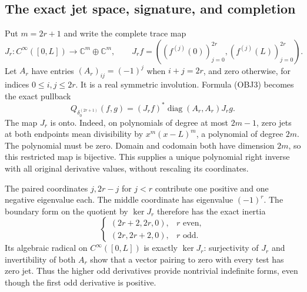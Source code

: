 \subsection{The exact jet space, signature, and completion}

Put $m=2r+1$ and write the complete trace map
\begin{equation}\tag{OBJ4}
 J_r:C^\infty([0,L])\longrightarrow\mathbb C^m\oplus\mathbb C^m,
 \qquad J_rf=((f^{(j)}(0))_{j=0}^{2r},(f^{(j)}(L))_{j=0}^{2r}).
\end{equation}
Let $A_r$ have entries $(A_r)_{ij}=(-1)^j$ when $i+j=2r$, and zero
otherwise, for indices $0\le i,j\le2r$. It is a real symmetric
involution. Formula (OBJ3) becomes the exact pullback
\begin{equation}\tag{OBJ5}
 Q_{\delta_0^{(2r+1)}}(f,g)
       =(J_rf)^*\operatorname{diag}(A_r,A_r)J_rg.
\end{equation}
The map $J_r$ is onto. Indeed, on polynomials of degree at most
$2m-1$, zero jets at both endpoints mean divisibility by
$x^m(x-L)^m$, a polynomial of degree $2m$. The polynomial must be
zero. Domain and codomain both have dimension $2m$, so this restricted
map is bijective. This supplies a unique polynomial right inverse
with all original derivative values, without rescaling its coordinates.

The paired coordinates $j,2r-j$ for $j<r$ contribute one positive
and one negative eigenvalue each. The middle coordinate has eigenvalue
$(-1)^r$. The boundary form on the quotient by $\ker J_r$ therefore
has the exact inertia
\begin{equation}\tag{OBJ6}
 \begin{cases}(2r+2,2r,0),&r\text{ even},\\
               (2r,2r+2,0),&r\text{ odd}.
 \end{cases}
\end{equation}
Its algebraic radical on $C^\infty([0,L])$ is exactly $\ker J_r$:
surjectivity of $J_r$ and invertibility of both $A_r$ show that a
vector pairing to zero with every test has zero jet. Thus the higher
odd derivatives provide nontrivial indefinite forms, even though
the first odd derivative is positive.

